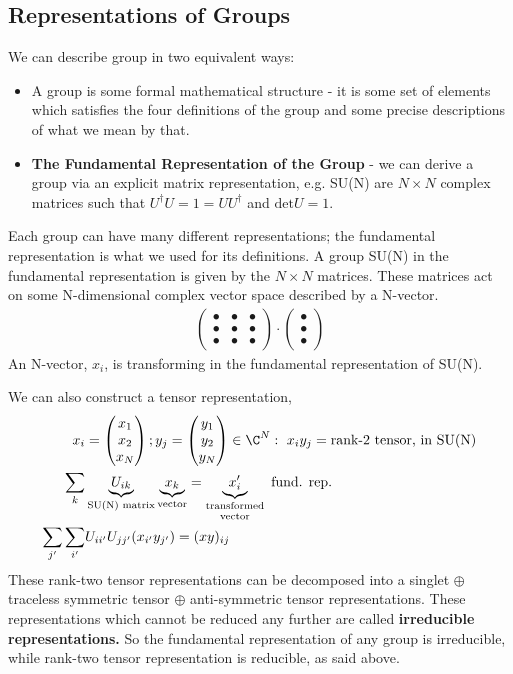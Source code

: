\documentclass[a4paper, 11pt, normalem]{report}
\begin{document}
\subsection{Representations of Groups}
We can describe group in two equivalent ways:
\begin{itemize}
    \item A group is some formal mathematical structure - it is some set of elements which satisfies the four definitions of the group and some precise descriptions of what we mean by that.
    \item \textbf{The Fundamental Representation of the Group} - we can derive a group via an explicit matrix representation, e.g. SU(N) are $N\times N$ complex matrices such that $U^\dagger U=1 = UU^\dagger$ and $\text{det}U=1$.
\end{itemize}
Each group can have many different representations; the fundamental representation is what we used for its definitions.
A group SU(N) in the fundamental representation is given by the $N\times N$ matrices.
These matrices act on some N-dimensional complex vector space described by a N-vector.
\begin{align}
    \begin{pmatrix} \bullet & \bullet & \bullet \\ \bullet & \bullet & \bullet \\ \bullet & \bullet & \bullet \end{pmatrix} \cdot \begin{pmatrix} \bullet \\ \bullet \\ \bullet\end{pmatrix}
\end{align}
An N-vector, $x_i$, is transforming in the fundamental representation of SU(N).

We can also construct a tensor representation,
\begin{align}
    x_i &= \begin{pmatrix} x_1\\ x_2\\x_N\end{pmatrix};y_j = \begin{pmatrix}y_1\\y_2\\y_N\end{pmatrix} \in \C^N:~ x_iy_j = \text{rank-2 tensor, in SU(N)} \\
    \sum_k & \underbrace{U_{ik}}_{\text{SU(N) matrix}}\underbrace{x_k}_{\text{vector}} = \underbrace{x'_i}_{\text{\shortstack{transformed\\ vector}}} \text{ fund. rep.} \\
    \sum_{j'}\sum_{i'} & U_{ii'}U_{jj'}(x_{i'}y_{j'}) = (xy)_{ij}
\end{align}
These rank-two tensor representations can be decomposed into a singlet $\oplus$ traceless symmetric tensor $\oplus$ anti-symmetric tensor representations.
These representations which cannot be reduced any further are called \textbf{irreducible representations.}
So the fundamental representation of any group is irreducible, while rank-two tensor representation is reducible, as said above.
\end{document}
